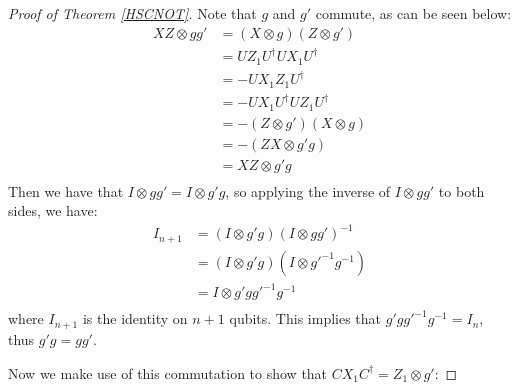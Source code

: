 \documentclass[12pt]{dalthesis}
\begin{document}
\begin{proof}[Proof of Theorem \ref{HSCNOT}]
Note that $g$ and $g'$ commute, as can be seen below:
\begin{align}
XZ \otimes gg' &= (X \otimes g)(Z \otimes g') \\
 &= UZ_1U^{\dag}UX_1U^{\dag} \\ 
 &= -UX_1Z_1U^\dag \\
 &= -UX_1U^\dag UZ_1U^\dag \\ 
 &= -(Z \otimes g')(X \otimes g) \\
 &= -(ZX \otimes g'g) \\
 &= XZ \otimes g'g \\
\end{align}
Then we have that $I \otimes gg' = I \otimes g'g$, so applying the inverse of $I \otimes gg'$ to both sides, we have:
\begin{align}
I_{n+1} &= (I \otimes g'g)(I \otimes gg')^{-1} \\
 &= (I \otimes g'g)(I \otimes g'^{-1}g^{-1}) \\ 
 &= I \otimes g'gg'^{-1}g^{-1} \\
\end{align}
where $I_{n+1}$ is the identity on $n+1$ qubits. This implies that $g'gg'^{-1}g^{-1} = I_n$, thus $g'g = gg'$.

Now we make use of this commutation to show that $CX_1C^\dag = Z_1 \otimes g'$:



\end{proof}
\end{document}
